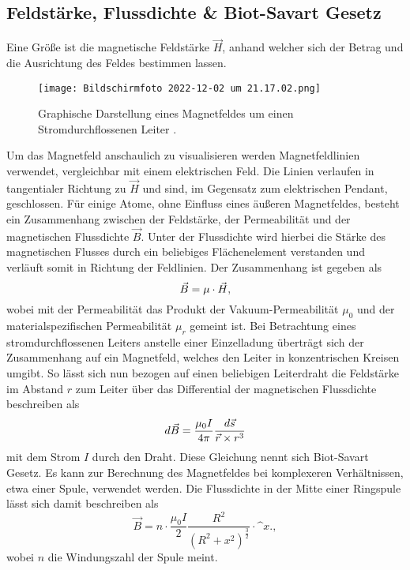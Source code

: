 \documentclass[11pt]{article}
\begin{document}
\subsection{Feldstärke, Flussdichte \& Biot-Savart Gesetz}
Eine Größe ist die magnetische Feldstärke $\vec{H}$, anhand welcher sich der Betrag und die Ausrichtung des Feldes
bestimmen lassen.
\begin{figure}
    \centering
    \texttt{[image: Bildschirmfoto 2022-12-02 um 21.17.02.png]}
    \caption{Graphische Darstellung eines Magnetfeldes um einen Stromdurchflossenen Leiter \cite{anleitung}.}
\end{figure}
Um das Magnetfeld anschaulich zu visualisieren werden Magnetfeldlinien verwendet, vergleichbar mit einem elektrischen Feld.
Die Linien verlaufen in tangentialer Richtung zu $\vec{H}$ und sind, im Gegensatz zum elektrischen Pendant, geschlossen.
Für einige Atome, ohne Einfluss eines äußeren Magnetfeldes, besteht ein Zusammenhang zwischen der Feldstärke, der
Permeabilität \mu und der magnetischen Flussdichte $\vec{B}$.
Unter der Flussdichte wird hierbei die Stärke des magnetischen Flusses durch ein beliebiges Flächenelement verstanden und
verläuft somit in Richtung der Feldlinien.
Der Zusammenhang ist gegeben als
\begin{equation}
    \vec{B} = \mu\cdot\vec{H},\notag
    \end{equation}
wobei mit der Permeabilität das Produkt der Vakuum-Permeabilität $\mu_{0}$ und der materialspezifischen Permeabilität
$\mu_{r}$ gemeint ist.
Bei Betrachtung eines stromdurchflossenen Leiters anstelle einer Einzelladung überträgt sich der Zusammenhang auf ein
Magnetfeld, welches den Leiter in konzentrischen Kreisen umgibt.
So lässt sich nun bezogen auf einen beliebigen Leiterdraht die Feldstärke im Abstand $r$ zum Leiter über das Differential
der magnetischen Flussdichte beschreiben als
\begin{equation}
    d\vec{B} = \frac{\mu_{0}I}{4\pi} \frac{d\vec{s}}{\vec{r}\times{r^3}}\notag
    \end{equation}
mit dem Strom $I$ durch den Draht.
Diese Gleichung nennt sich Biot-Savart Gesetz.
Es kann zur Berechnung des Magnetfeldes bei komplexeren Verhältnissen, etwa einer Spule, verwendet werden.
Die Flussdichte in der Mitte einer Ringspule lässt sich damit beschreiben als
\begin{equation}
    \vec{B} = n \cdot \frac{\mu_{0}I}{2}\frac{R^2}{(R^2 + x^2)^{\frac{3}{2}}}\cdot\^{x} . \label{eq:BFeld} ,
    \end{equation}
wobei $n$ die Windungszahl der Spule meint.
\end{document}
